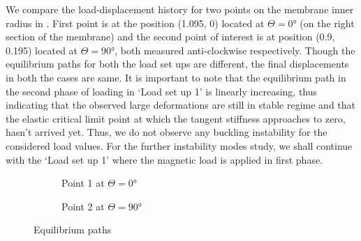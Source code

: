 We compare the load-displacement history for two points on the membrane inner radius in . First point is at the position (1.095, 0) located at $\Theta = \ang{0}$ (on the right section of the membrane) and the second point of interest is at position (0.9, 0.195) located at $\Theta = \ang{90}$, both measured anti-clockwise respectively. Though the equilibrium paths for both the load set ups are different, the final displacements in both the cases are same. It is important to note that the equilibrium path in the second phase of loading in `Load set up 1' is linearly increasing, thus indicating that the observed large deformations are still in stable regime and that the elastic critical limit point at which the tangent stiffness approaches to zero, hasn't arrived yet. Thus, we do not observe any buckling instability for the considered load values. For the further instability modes study, we shall continue with the `Load set up 1' where the magnetic load is applied in first phase. \par  

\begin{figure}[h]
\begin{subfigure}[t]{0.49\linewidth}
\centering
{}
\caption{Point 1 at $\Theta = \ang{0}$}
\label{fig:3.15.1}
\end{subfigure}
\begin{subfigure}[t]{0.49\linewidth}
\centering
{}
\caption{Point 2 at $\Theta = \ang{90}$}
\label{fig:3.15.2}
\end{subfigure}
\caption{Equilibrium paths}
\label{fig:3.15}
\end{figure}

